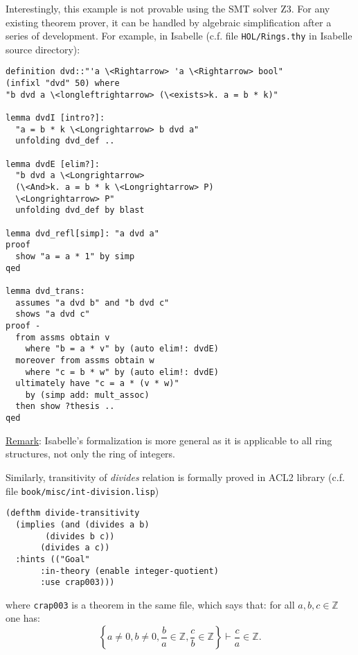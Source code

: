 \documentclass[12pt]{article}
\begin{document}
Interestingly, this example is not provable using the SMT solver Z3. For any existing theorem prover, it can be handled by algebraic simplification after a series of development. For example, in Isabelle (c.f. file \texttt{HOL/Rings.thy} in Isabelle source directory):

\begin{lstlisting}
definition dvd::"'a \<Rightarrow> 'a \<Rightarrow> bool"
(infixl "dvd" 50) where
"b dvd a \<longleftrightarrow> (\<exists>k. a = b * k)"

lemma dvdI [intro?]:
  "a = b * k \<Longrightarrow> b dvd a"
  unfolding dvd_def ..

lemma dvdE [elim?]:
  "b dvd a \<Longrightarrow> 
  (\<And>k. a = b * k \<Longrightarrow> P)
  \<Longrightarrow> P"
  unfolding dvd_def by blast 
  
lemma dvd_refl[simp]: "a dvd a"
proof
  show "a = a * 1" by simp
qed

lemma dvd_trans:
  assumes "a dvd b" and "b dvd c"
  shows "a dvd c"
proof -
  from assms obtain v
    where "b = a * v" by (auto elim!: dvdE)
  moreover from assms obtain w 
    where "c = b * w" by (auto elim!: dvdE)
  ultimately have "c = a * (v * w)" 
    by (simp add: mult_assoc)
  then show ?thesis ..
qed
\end{lstlisting}

\underline{Remark}: Isabelle's formalization is more general as it is applicable to all ring structures, not only the ring of integers.

Similarly, transitivity of \emph{divides} relation is formally proved in ACL2 library (c.f. file \texttt{book/misc/int-division.lisp})
\begin{lstlisting}
(defthm divide-transitivity
  (implies (and (divides a b)
		(divides b c))
	   (divides a c))
  :hints (("Goal"
	   :in-theory (enable integer-quotient)
	   :use crap003)))
\end{lstlisting}
\newcommand{\setZ}{\mathbb{Z}}
where \texttt{crap003} is a theorem in the same file, which says that: for all $a,b,c \in \setZ$ one has:
$$\left\{ a \not= 0, b \not= 0, \frac{b}{a} \in \setZ,\frac{c}{b} \in \setZ \right\} \vdash \frac{c}{a} \in \setZ.$$
\end{document}
